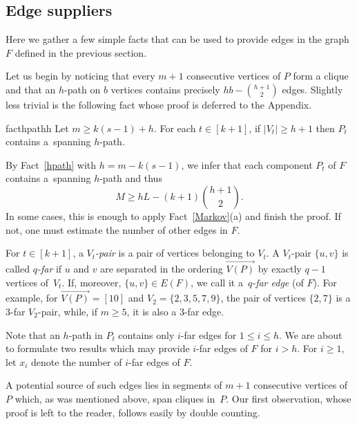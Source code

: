 \documentclass[reqno, 12pt]{amsart}
\numberwithin{equation}{section}
\numberwithin{figure}{section}
\theoremstyle{plain}
\theoremstyle{definition}
\begin{document}

\subsection{Edge suppliers}\label{prep}

Here we gather a few simple facts that can be used to provide edges in the graph $F$ defined in the previous section.

Let us begin by noticing that every $m+1$ consecutive vertices of $P$ form a clique and that an $h$-path on $b$ vertices contains precisely $hb-\binom{h+1}2$ edges.
Slightly less trivial is the following fact whose proof is deferred  to the Appendix.

\begin{restatable}[]{fact}{hpathh}
\label{hpath}
Let $m\ge k(s-1)+h$. For each $t\in[k+1]$, if $|V_t|\ge h+1$
then  $P_t$ contains a~spanning $h$-path.
\end{restatable}

By Fact~\ref{hpath} with $h=m-k(s-1)$,
we infer that each component $P_t$ of $F$ contains a~spanning $h$-path and thus
\begin{equation}\label{eq:M_h_estimate}
M\ge hL-(k+1){h+1\choose 2}.
\end{equation}
In some cases, this is enough to apply Fact~\ref{Markov}(a) and finish the proof. If not, one must estimate the number of other edges in $F$.

For $t\in[k+1]$, a \emph{$V_t$-pair} is a pair of vertices  belonging to $V_t$.
 A $V_t$-pair $\{u,v\}$ is called \emph{$q$-far} if $u$ and $v$ are separated in the ordering $\overrightarrow{V(P)}$ by exactly $q-1$ vertices of~$V_t$. If, moreover, $\{u,v\}\in E(F)$, we call it a~\emph{$q$-far edge} (of $F$). For example, for $\overrightarrow{V(P)}=[10]$ and $V_2=\{2,3,5,7,9\}$, the pair of vertices $\{2,7\}$ is a 3-far $V_2$-pair, while, if $m\ge5$, it is also a 3-far edge.

Note that an $h$-path in $P_t$ contains only $i$-far edges for $1\le i\le h$.
We are about to formulate two results which may provide $i$-far edges of $F$ for $i>h$. For $i\ge1$, let $x_i$ denote the number of $i$-far edges of $F$.

A potential source of such edges lies in segments of $m+1$ consecutive vertices of $P$ which, as was mentioned above, span cliques in~$P$.   Our first observation, whose proof is left to the reader, follows easily by double counting.
\end{document}
